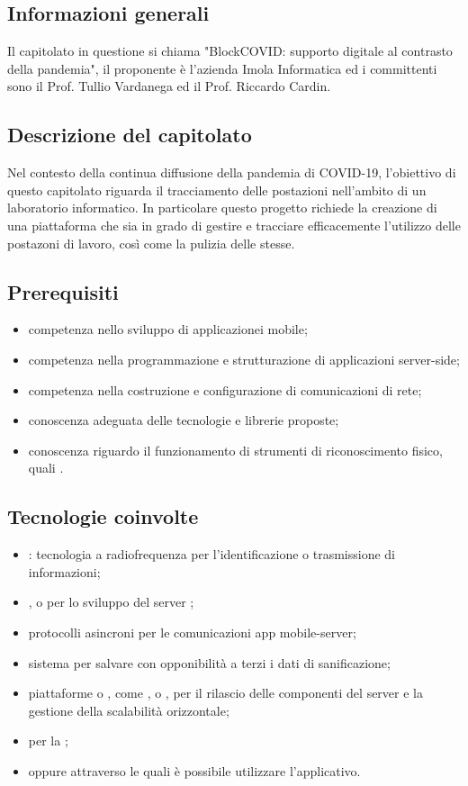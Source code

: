 
\subsection{Informazioni generali}
Il capitolato in questione si chiama "BlockCOVID: supporto digitale al contrasto della pandemia", il proponente è l'azienda Imola Informatica ed i committenti sono il Prof. Tullio Vardanega ed il Prof. Riccardo Cardin.

\subsection{Descrizione del capitolato}
Nel contesto della continua diffusione della pandemia di COVID-19, l'obiettivo di questo capitolato riguarda il tracciamento delle postazioni nell'ambito di un laboratorio informatico. In particolare questo progetto richiede la creazione di una piattaforma che sia in grado di gestire e tracciare efficacemente l'utilizzo delle postazoni di lavoro, così come la pulizia delle stesse.

\subsection{Prerequisiti}
\begin{itemize}
\item competenza nello sviluppo di applicazionei mobile;
\item competenza nella programmazione e strutturazione di applicazioni server-side;
\item competenza nella costruzione e configurazione di comunicazioni di rete;
\item conoscenza adeguata delle tecnologie e librerie proposte;
\item conoscenza riguardo il funzionamento di strumenti di riconoscimento fisico, quali .
\end{itemize}

\subsection{Tecnologie coinvolte}
\begin{itemize}
\item {}: tecnologia a radiofrequenza per l'identificazione o trasmissione di informazioni;
\item {},  o  per lo sviluppo del server ;
\item protocolli asincroni per le comunicazioni app mobile-server;
\item sistema  per salvare con opponibilità a terzi i dati di sanificazione;
\item piattaforme  o , come ,  o , per il rilascio delle componenti del server e la gestione della scalabilità orizzontale;
\item {} per la ;
\item {} oppure  attraverso le quali è possibile utilizzare l'applicativo.
\end{itemize}

